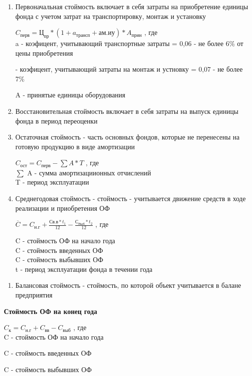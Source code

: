 \documentclass[11pt]{article}
\begin{document}
\begin{enumerate}
\item Первоначальная стоймость включает в себя затраты на приобретение единицы фонда с учетом затрат на транспортировку, монтаж и установку

$C_{\text{перв}} = Ц_{\text{пр}} * (1+a_{\text{трансп}} + \text{ам.иу}) * A_{\text{прин}}$
, где \\[0pt]
 a\textsubscript{} - коэфицент, учитывающий транспортные затраты = 0,06 - не более 6\% от цены приобретения

 - коэфицент, учитывающий затраты на монтаж и устновку = 0,07 - не более 7\%

A\textsubscript{} - принятые единицы оборудования

\item Восстановительная стоймость включает в себя затраты на выпуск единицы фонда в период переоценки

\item Остаточная стоймость - часть основных фондов, которые не перенесены на готовую продукцию в виде амортизации

$C_{\text{ост}} = C_{\text{перв}} - \sum A * T$
, где \\[0pt]
\(\sum\) A - сумма амортизациионных отчислений \\[0pt]
T - период эксплуатации

\item Среднегодовая стоймость - стоймость - учитывается движение средств в ходе реализации и приобретения ОФ

\begin{math}
  \overline{C} = C_{\text{н.г}} + \frac{\text{Св.в} * t_1}{12} - \frac{С_{\text{Выб}} * t_2}{12}
\end{math}
, где

C\textsubscript{} - стоймость ОФ на начало года \\[0pt]
C\textsubscript{} - стоймость введенных ОФ \\[0pt]
C\textsubscript{} - стоймость выбывших ОФ \\[0pt]
t - период эксплуатации фонда в течении года \\[0pt]
\end{enumerate}


\begin{enumerate}
\item Балансовая стоймость - стоймость, по которой объект учитывается в балане предприятия
\end{enumerate}

\begin{center}
\textbf{Стоймость ОФ на конец года}
\end{center}

$C_{\text{к}} = C_{\text{н.г}} + C_{\text{вв}} - C_{\text{выб}}$
, где \\[0pt]

C\textsubscript{} - стоймость ОФ на начало года

C\textsubscript{} - стоймость введенных ОФ

C\textsubscript{} - стоймость выбывших ОФ
\end{document}

